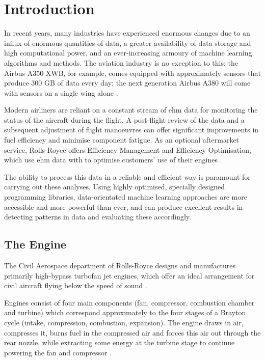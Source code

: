 \section{Introduction}
In recent years, many industries have experienced enormous changes due to an influx of enormous quantities of data, a greater availability of data storage and high computational power, and an ever-increasing armoury of machine learning algorithms and methods. The aviation industry is no exception to this: the Airbus A350 XWB, for example, comes equipped with approximately  sensors that produce 300 GB of data every day; the next generation Airbus A380 will come with  sensors on a single wing alone \cite{rajaraman_big_2016}.

Modern airliners are reliant on a constant stream of \ac{ehm} data for monitoring the status of the aircraft during the flight. A post-flight review of the data and a subsequent adjustment of flight manoeuvres can offer significant improvements in fuel efficiency and minimise component fatigue. As an optional aftermarket service, Rolls-Royce offers Efficiency Management and Efficiency Optimisation, which use \ac{ehm} data with  to optimise customers' use of their engines \cite{rolls-royce_plc_airlines_2020}.

The ability to process this data in a reliable and efficient way is paramount for carrying out these analyses. Using highly optimised, specially designed programming libraries, data-orientated machine learning approaches are more accessible and more powerful than ever, and can produce excellent results in detecting patterns in data and evaluating these accordingly. 

\subsection{The Engine}
The Civil Aerospace department of Rolls-Royce designs and manufactures primarily high-bypass turbofan jet engines, which offer an ideal arrangement for civil aircraft flying below the speed of sound \cite{rolls-royce_plc_jet_2015}.

Engines consist of four main components (fan, compressor, combustion chamber and turbine) which correspond approximately to the four stages of a Brayton cycle (intake, compression, combustion, expansion). The engine draws in air, compresses it, burns fuel in the compressed air and forces this air out through the rear nozzle, while extracting some energy at the turbine stage to continue powering the fan and compressor \cite{rolls-royce_plc_jet_2015}.

